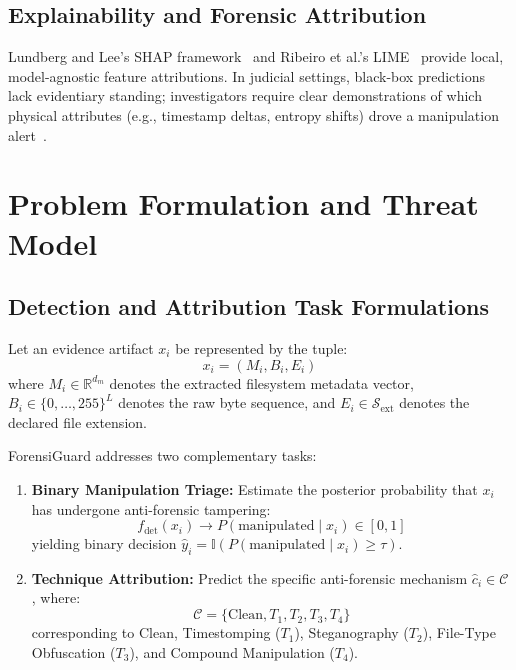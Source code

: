 \documentclass[conference]{IEEEtran}
\begin{document}
\subsection{Explainability and Forensic Attribution}
Lundberg and Lee's SHAP framework~\cite{lundberg2017unified} and Ribeiro et al.'s LIME~\cite{ribeiro2016should} provide local, model-agnostic feature attributions. In judicial settings, black-box predictions lack evidentiary standing; investigators require clear demonstrations of which physical attributes (e.g., timestamp deltas, entropy shifts) drove a manipulation alert~\cite{roussev2009file}.

\section{Problem Formulation and Threat Model}
\subsection{Detection and Attribution Task Formulations}
Let an evidence artifact $x_i$ be represented by the tuple:
\begin{equation}
    x_i = (M_i, B_i, E_i)
\end{equation}
where $M_i \in \mathbb{R}^{d_m}$ denotes the extracted filesystem metadata vector, $B_i \in \{0, \dots, 255\}^L$ denotes the raw byte sequence, and $E_i \in \mathcal{S}_{\text{ext}}$ denotes the declared file extension.

ForensiGuard addresses two complementary tasks:
\begin{enumerate}
    \item \textbf{Binary Manipulation Triage:} Estimate the posterior probability that $x_i$ has undergone anti-forensic tampering:
    \begin{equation}
        f_{\text{det}}(x_i) \to P(\text{manipulated} \mid x_i) \in [0, 1]
    \end{equation}
    yielding binary decision $\hat{y}_i = \mathbb{I}(P(\text{manipulated} \mid x_i) \ge \tau)$.
    \item \textbf{Technique Attribution:} Predict the specific anti-forensic mechanism $\hat{c}_i \in \mathcal{C}$, where:
    \begin{equation}
        \mathcal{C} = \{\text{Clean}, T_1, T_2, T_3, T_4\}
    \end{equation}
    corresponding to Clean, Timestomping ($T_1$), Steganography ($T_2$), File-Type Obfuscation ($T_3$), and Compound Manipulation ($T_4$).
\end{enumerate}
\end{document}
